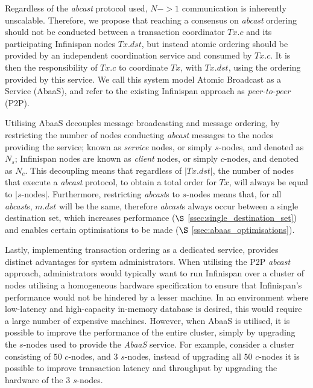 Regardless of the \emph{abcast} protocol used, $N->1$ communication is inherently unscalable.  Therefore, we propose that reaching a consensus on \emph{abcast} ordering should not be conducted between a transaction coordinator $Tx.c$ and its participating Infinispan nodes $Tx.dst$, but instead atomic ordering should be provided by an independent coordination service and consumed by $Tx.c$.  It is then the responsibility of $Tx.c$ to coordinate $Tx$, with $Tx.dst$, using the ordering provided by this service.  We call this system model Atomic Broadcast as a Service (\textsf{AbaaS}), and refer to the existing Infinispan approach as \emph{peer-to-peer} (P2P).  

Utilising \textsf{AbaaS} decouples message broadcasting and message ordering, by restricting the number of nodes conducting \emph{abcast} messages to the nodes providing the service; known as \emph{service} nodes, or simply $s$-nodes, and denoted as $N_s$; Infinispan nodes are known as \emph{client} nodes, or simply $c$-nodes, and denoted as $N_c$.  This decoupling means that regardless of $\left\vert Tx.dst \right\vert$, the number of nodes that execute a \emph{abcast} protocol, to obtain a total order for $Tx$, will always be equal to $\left\vert s\text{-nodes}\right\vert$.  Furthermore, restricting \emph{abcast}s to $s$-nodes means that, for all \emph{abcast}s, $m.dst$ will be the same, therefore \emph{abcast}s always occur between a single destination set, which increases performance ($\S$ \ref{ssec:single_destination_set}) and enables certain optimisations to be made ($\S$ \ref{ssec:abaas_optimisations}).  

	Lastly, implementing transaction ordering as a dedicated service, provides distinct advantages for system administrators.  When utilising the P2P \emph{abcast} approach, administrators would typically want to run Infinispan over a cluster of nodes utilising a homogeneous hardware specification to ensure that Infinispan's performance would not be hindered by a lesser machine.  In an environment where low-latency and high-capacity in-memory database is desired, this would require a large number of expensive machines. However, when AbaaS is utilised, it is possible to improve the performance of the entire cluster, simply by upgrading the $s$-nodes used to provide the \emph{AbaaS} service.  For example, consider a cluster consisting of $50$ $c$-nodes, and $3$ $s$-nodes, instead of upgrading all $50$ $c$-nodes it is possible to improve transaction latency and throughput by upgrading the hardware of the $3$ $s$-nodes.  
	
